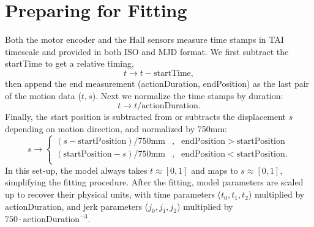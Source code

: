\documentclass[CTN,lsstdraft,authoryear,toc]{lsstdoc}
\newcommand{\eq}[1]{\begin{equation}#1\end{equation}}
\newcommand{\ead}[1]{\begin{aligned}#1\end{aligned}}
\begin{document}
\section{Preparing for Fitting}
Both the motor encoder and the Hall sensors measure time stamps in TAI timescale and provided in both ISO and MJD format.  We first subtract the startTime to get a relative timing,
\begin{equation}
    t \to t - \mathrm{startTime},
\end{equation}
then append the end measurement (actionDuration, endPosition) as the last pair of the motion data ($t, s$). Next we normalize the time stamps by duration:
\eq{
    t \to t/\mathrm{actionDuration}.
}
Finally, the start position is subtracted from or subtracts the displacement $s$ depending on motion direction, and normalized by 750mm:
\eq{
	s \to
	\left\{ \ead{
			(s - \mathrm{startPosition})/750 \mathrm{mm} &, & \mathrm{endPosition} > \mathrm{startPosition}  \\
			(\mathrm{startPosition} - s)/750 \mathrm{mm} &, & \mathrm{endPosition} < \mathrm{startPosition}.  \\
}
\right.
}
In this set-up, the model always takes $t \approx [0,1]$ and maps to $s \approx [0,1]$, simplifying the fitting procedure. After the fitting, model parameters are scaled up to recover their physical units, with time parameters ($t_0, t_1, t_2$) multiplied by actionDuration, and jerk parameters ($j_0, j_1, j_2$) multiplied by $750 \cdot \mathrm{actionDuration}^{-3}$.
\end{document}
